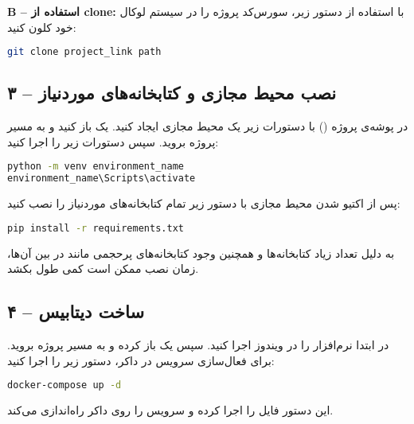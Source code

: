 \documentclass{article}
\begin{document}
\textbf{B – استفاده از clone:}  
با استفاده از دستور زیر، سورس‌کد پروژه را در سیستم لوکال خود کلون کنید:
\begin{latin}
\begin{lstlisting}[language=bash]
git clone project_link path
\end{lstlisting}
\end{latin}

\subsection{۳ – نصب محیط مجازی و کتابخانه‌های موردنیاز}
در پوشه‌ی پروژه () با دستورات زیر یک محیط مجازی ایجاد کنید.  
یک  باز کنید و به مسیر  پروژه بروید.  
سپس دستورات زیر را اجرا کنید:
\begin{latin}
\begin{lstlisting}[language=bash]
python -m venv environment_name
environment_name\Scripts\activate
\end{lstlisting}
\end{latin}

پس از اکتیو شدن محیط مجازی با دستور زیر تمام کتابخانه‌های موردنیاز را نصب کنید:
\begin{latin}
\begin{lstlisting}[language=bash]
pip install -r requirements.txt
\end{lstlisting}
\end{latin}

به دلیل تعداد زیاد کتابخانه‌ها و همچنین وجود کتابخانه‌های پرحجمی مانند  در بین آن‌ها، زمان نصب ممکن است کمی طول بکشد.

\subsection{۴ – ساخت دیتابیس }
در ابتدا نرم‌افزار  را در ویندوز اجرا کنید.  
سپس یک  باز کرده و به مسیر  پروژه بروید.  
برای فعال‌سازی سرویس  در داکر، دستور زیر را اجرا کنید:
\begin{latin}
\begin{lstlisting}[language=bash]
docker-compose up -d
\end{lstlisting}
\end{latin}

این دستور فایل  را اجرا کرده و سرویس  را روی داکر راه‌اندازی می‌کند.
\end{document}
